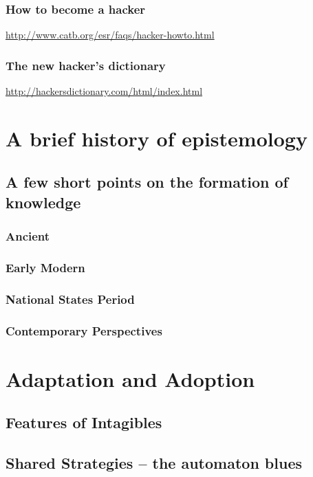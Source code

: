 \documentclass[11pt]{article}
\begin{document}
\subsubsection{How to become a hacker}
\label{sec:org128bb82}
\url{http://www.catb.org/esr/faqs/hacker-howto.html}
\subsubsection{The new hacker's dictionary}
\label{sec:orgf410ec6}
\url{http://hackersdictionary.com/html/index.html}


\section{A brief history of epistemology}
\label{sec:orgce1bddc}
\subsection{A few short points on the formation of knowledge}
\label{sec:orgebafc7e}
\subsubsection{Ancient}
\label{sec:org4706dfd}
\subsubsection{Early Modern}
\label{sec:org9a0e695}
\subsubsection{National States Period}
\label{sec:org6f8ea1f}
\subsubsection{Contemporary Perspectives}
\label{sec:orgec7e30c}


\section{Adaptation and Adoption}
\label{sec:org6f05a8b}
\subsection{Features of Intagibles}
\label{sec:org704d52b}
\subsection{Shared Strategies – the automaton blues}
\label{sec:orgc1b6567}
\end{document}
